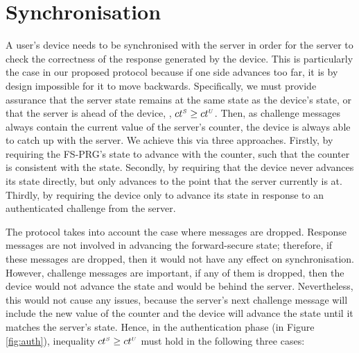 


\section{Synchronisation}
\label{app:synchronisation}

A user's device needs to be synchronised with the server
in order for the server to check the correctness of the response generated by the device.
This is particularly the case in our proposed protocol because
if one side advances too far, it is by design impossible for it to
move backwards. Specifically, we must provide assurance that the server state remains at the same state as the device's state, or that the server is ahead of the device, \ie, ${ct}^{\scriptscriptstyle S} \geq {ct}^{\scriptscriptstyle U}$. Then, as challenge messages always contain the current value of the server's counter, the device is always able to catch up with the server. We achieve this via three approaches.  Firstly, by requiring the FS-PRG's state to advance with the counter, such that the counter is consistent with the state. Secondly, by requiring that the device never advances its state directly, but only advances to the point that the server currently is at. Thirdly, by requiring the device only to advance its state in response to an authenticated challenge from the server.%


The protocol takes into account the case where messages are dropped.
Response messages are not involved in advancing the forward-secure state; therefore, if these messages are dropped, then it would not have any effect on synchronisation. However, challenge messages are important, if any of them is dropped, then the device would not advance the state and would be behind the server. Nevertheless, this would not cause any issues, because the server's next challenge message will include the new value of the counter and the device will advance the state until it matches the server's state. Hence, in the authentication phase (in Figure \ref{fig:auth}), inequality ${ct}^{\scriptscriptstyle S} \geq {ct}^{\scriptscriptstyle U}$ must hold in the following three cases:  


